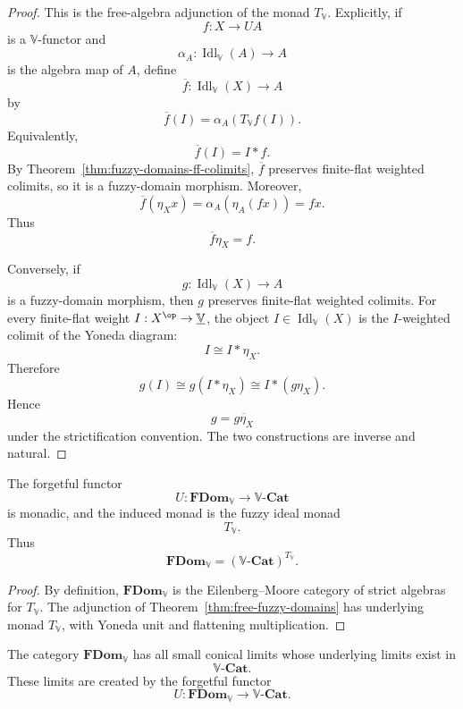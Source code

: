 \begin{proof}
This is the free-algebra adjunction of the monad \(T_{\mathbb V}\).  Explicitly,
if
\[
    f:X\to UA
\]
is a \(\mathbb V\)-functor and
\[
    \alpha_A:\operatorname{Idl}_{\mathbb V}(A)\to A
\]
is the algebra map of \(A\), define
\[
    \overline f:
    \operatorname{Idl}_{\mathbb V}(X)\to A
\]
by
\[
    \overline f(I)
    =
    \alpha_A(T_{\mathbb V}f(I)).
\]
Equivalently,
\[
    \overline f(I)=I*f.
\]
By Theorem~\ref{thm:fuzzy-domains-ff-colimits}, \(\overline f\) preserves
finite-flat weighted colimits, so it is a fuzzy-domain morphism.  Moreover,
\[
    \overline f(\eta_Xx)
    =
    \alpha_A(\eta_A(fx))
    =
    fx.
\]
Thus
\[
    \overline f\eta_X=f.
\]

Conversely, if
\[
    g:\operatorname{Idl}_{\mathbb V}(X)\to A
\]
is a fuzzy-domain morphism, then \(g\) preserves finite-flat weighted colimits.
For every finite-flat weight \(I:X^{\op}\to\underline{\mathbb V}\), the object
\(I\in\operatorname{Idl}_{\mathbb V}(X)\) is the \(I\)-weighted colimit of the
Yoneda diagram:
\[
    I\cong I*\eta_X.
\]
Therefore
\[
    g(I)
    \cong
    g(I*\eta_X)
    \cong
    I*(g\eta_X).
\]
Hence
\[
    g=\overline{g\eta_X}
\]
under the strictification convention.  The two constructions are inverse and
natural.
\end{proof}

\begin{corollary}[Monadicity]
\label{cor:fdom-monadicity}
The forgetful functor
\[
    U:\mathbf{FDom}_{\mathbb V}\to \mathbb V\text{-}\mathbf{Cat}
\]
is monadic, and the induced monad is the fuzzy ideal monad
\[
    T_{\mathbb V}.
\]
Thus
\[
    \mathbf{FDom}_{\mathbb V}=(\mathbb V\text{-}\mathbf{Cat})^{T_{\mathbb V}}.
\]
\end{corollary}

\begin{proof}
By definition, \(\mathbf{FDom}_{\mathbb V}\) is the Eilenberg--Moore category of
strict algebras for \(T_{\mathbb V}\).  The adjunction of
Theorem~\ref{thm:free-fuzzy-domains} has underlying monad \(T_{\mathbb V}\), with
Yoneda unit and flattening multiplication.
\end{proof}

\begin{theorem}
\label{thm:fdom-limits}
The category \(\mathbf{FDom}_{\mathbb V}\) has all small conical limits whose
underlying limits exist in
\[
    \mathbb V\text{-}\mathbf{Cat}.
\]
These limits are created by the forgetful functor
\[
    U:\mathbf{FDom}_{\mathbb V}\to \mathbb V\text{-}\mathbf{Cat}.
\]
\end{theorem}

